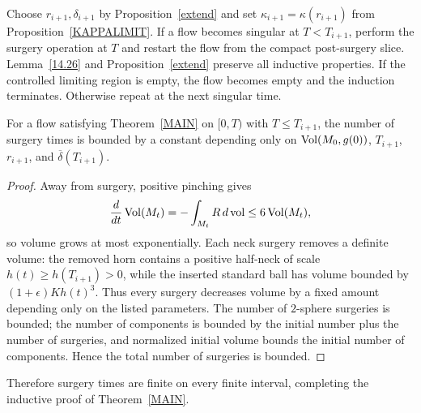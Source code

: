 Choose $r_{i+1},\delta_{i+1}$ by Proposition~\ref{extend} and set
$\kappa_{i+1}=\kappa(r_{i+1})$ from Proposition~\ref{KAPPALIMIT}. If a flow
becomes singular at $T<T_{i+1}$, perform the surgery operation at $T$ and
restart the flow from the compact post-surgery slice. Lemma~\ref{14.26} and
Proposition~\ref{extend} preserve all inductive properties. If the controlled
limiting region is empty, the flow becomes empty and the induction terminates.
Otherwise repeat at the next singular time.

\begin{lemma}
\label{lem:bounded-number-of-surgeries}

\label{bddsurgery}
For a flow satisfying Theorem~\ref{MAIN} on $[0,T)$ with $T\leq T_{i+1}$,
the number of surgery times is bounded by a constant depending only on
$\operatorname{Vol}(M_0,g(0))$, $T_{i+1}$, $r_{i+1}$, and
$\overline\delta(T_{i+1})$.
\end{lemma}

\begin{proof}
\sketch
{}
Away from surgery, positive pinching gives
\[
  \frac{d}{dt}\operatorname{Vol}(M_t)=-\int_{M_t}R\,d\operatorname{vol}\leq6\operatorname{Vol}(M_t),
\]
so volume grows at most exponentially. Each neck surgery removes a definite
volume: the removed horn contains a positive half-neck of scale
$h(t)\geq h(T_{i+1})>0$, while the inserted standard ball has volume bounded by
$(1+\epsilon)Kh(t)^3$. Thus every surgery decreases volume by a fixed amount
depending only on the listed parameters. The number of $2$-sphere surgeries is
bounded; the number of components is bounded by the initial number plus the
number of surgeries, and normalized initial volume bounds the initial number of
components. Hence the total number of surgeries is bounded.
\end{proof}

Therefore surgery times are finite on every finite interval, completing the
inductive proof of Theorem~\ref{MAIN}.
